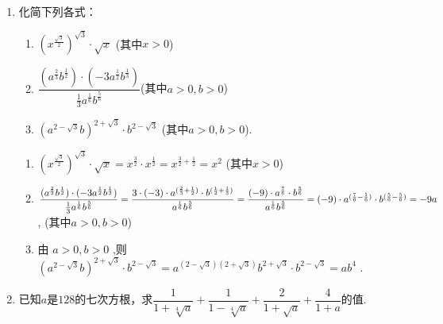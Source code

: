 \begin{enumerate}
    \begin{jieda}
        由 $x > 0$ ,则 ${\left( {x}^{\frac{\sqrt{3}}{2}}\right) }^{\sqrt{3}} \cdot  \sqrt{x} = {x}^{\frac{3}{2}} \cdot  {x}^{\frac{1}{2}} = {x}^{2}$ .
    \end{jieda}
    \item 化简下列各式：
    \begin{enumerate}
        \item $(x^\frac{\sqrt{3}}{2})^{\sqrt{3}} \cdot \sqrt{x}$ (其中$x > 0$)
        \item $\dfrac{(a^{\frac{2}{3}}b^{\frac{1}{2}})\cdot(-3a^{\frac{1}{2}}b^{\frac{1}{3}})}{\frac{1}{3}a^{\frac{1}{6}}b^{\frac{5}{6}}}$(其中$a > 0, b > 0$)
        \item ${\left( {a}^{2 - \sqrt{3}}b\right) }^{2 + \sqrt{3}} \cdot  {b}^{2 - \sqrt{3}}$ (其中$a > 0, b > 0$).
    \end{enumerate}
    \begin{jieda}
        \begin{enumerate}
            \item $(x^\frac{\sqrt{3}}{2})^{\sqrt{3}} \cdot \sqrt{x} = x^{\frac{3}{2}} \cdot x^{\frac{1}{2}} = x^{\frac{3}{2} + \frac{1}{2}} = x^2$ (其中$x > 0$)
            \item $\dfrac{(a^{\frac{2}{3}}b^{\frac{1}{2}})\cdot(-3a^{\frac{1}{2}}b^{\frac{1}{3}})}{\frac{1}{3}a^{\frac{1}{6}}b^{\frac{5}{6}}} = \dfrac{3 \cdot (-3) \cdot a^{(\frac{2}{3} + \frac{1}{2})} \cdot b^{(\frac{1}{2} +\frac{1}{3})}}{a^{\frac{1}{6}}b^{\frac{5}{6}}} = \dfrac{(-9) \cdot a^{\frac{7}{6}} \cdot b^{\frac{5}{6}}}{a^{\frac{1}{6}}b^{\frac{5}{6}}} \\ = (-9) \cdot a^{(\frac{7}{6}-\frac{1}{6})} \cdot b^{(\frac{5}{6} - \frac{5}{6})} = -9a$, (其中$a > 0, b > 0$)
            \item  由 $a > 0,b > 0$ ,则 ${\left( {a}^{2 - \sqrt{3}}b\right) }^{2 + \sqrt{3}} \cdot  {b}^{2 - \sqrt{3}} = {a}^{\left( {2 - \sqrt{3}}\right) \left( {2 + \sqrt{3}}\right) }{b}^{2 + \sqrt{3}} \cdot  {b}^{2 - \sqrt{3}} = a{b}^{4}$ .
        \end{enumerate}
    \end{jieda}
    \item 已知$a$是$128$的七次方根，求$\dfrac{1}{1+\sqrt[4]{a}} + \dfrac{1}{1-\sqrt[4]{a}} + \dfrac{2}{1+\sqrt{a}} + \dfrac{4}{1+a}$的值.
\end{enumerate}
